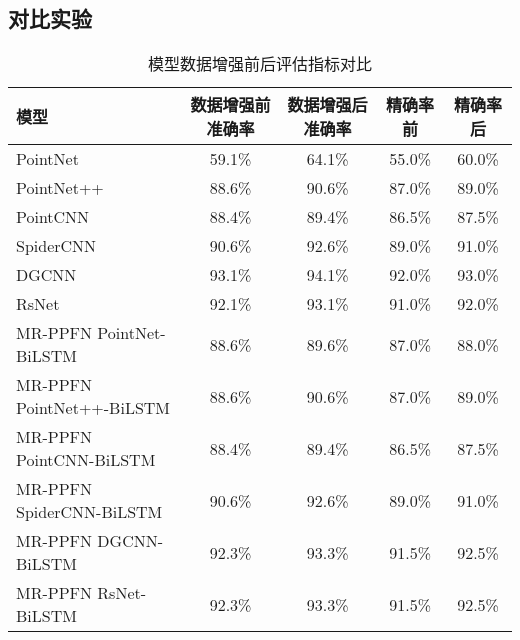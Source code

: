 \subsection{对比实验}
\begin{table}[htbp]
    \centering
    \caption{模型数据增强前后评估指标对比}
    \label{tab:model-comparison}
    \begin{tabular}{lcccc}
        \toprule
        \textbf{模型} & \textbf{数据增强前准确率} & \textbf{数据增强后准确率} & \textbf{精确率前} & \textbf{精确率后} \\
        \midrule
        PointNet & 59.1\% & 64.1\% & 55.0\% & 60.0\% \\
        PointNet++ & 88.6\% & 90.6\% & 87.0\% & 89.0\% \\
        PointCNN & 88.4\% & 89.4\% & 86.5\% & 87.5\% \\
        SpiderCNN & 90.6\% & 92.6\% & 89.0\% & 91.0\% \\
        DGCNN & 93.1\% & 94.1\% & 92.0\% & 93.0\% \\
        RsNet & 92.1\% & 93.1\% & 91.0\% & 92.0\% \\
        MR-PPFN PointNet-BiLSTM & 88.6\% & 89.6\% & 87.0\% & 88.0\% \\
        MR-PPFN PointNet++-BiLSTM & 88.6\% & 90.6\% & 87.0\% & 89.0\% \\
        MR-PPFN PointCNN-BiLSTM & 88.4\% & 89.4\% & 86.5\% & 87.5\% \\
        MR-PPFN SpiderCNN-BiLSTM & 90.6\% & 92.6\% & 89.0\% & 91.0\% \\
        MR-PPFN DGCNN-BiLSTM & 92.3\% & 93.3\% & 91.5\% & 92.5\% \\
        MR-PPFN RsNet-BiLSTM & 92.3\% & 93.3\% & 91.5\% & 92.5\% \\
        \bottomrule
    \end{tabular}
\end{table}
 


